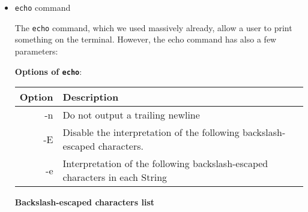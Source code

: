 \documentclass{article}
\newcommand{\inlinecode}[1]{\colorbox{backcolour}{\footnotesize{\texttt{#1}}}}
\begin{document}
\begin{itemize}

	\item \inlinecode{echo} command

	      The \inlinecode{echo} command, which we used massively already, allow a user to print something on the terminal. However, the echo command has also a few parameters:

	      \begin{paracol}{2}
		      \textbf{Options of \inlinecode{echo}}:

		      \footnotesize{\begin{tabularx}{\linewidth}{| r | >{\raggedright\arraybackslash}X| }
				      \hline
				      Option & Description                                                                 \\ \hline
				      -n     & Do not output a trailing newline                                            \\ \hline
				      -E     & Disable the interpretation of the following backslash-escaped characters.   \\ \hline
				      -e     & Interpretation of the following backslash-escaped characters in each String \\ \hline
			      \end{tabularx}}

		      \switchcolumn

		      \raggedright\textbf{Backslash-escaped characters list}


\end{paracol}
\end{itemize}
\end{document}
